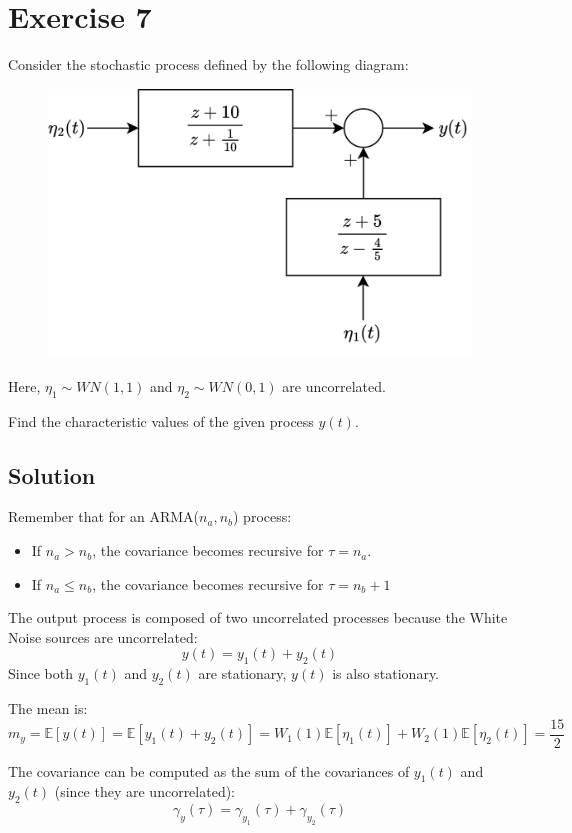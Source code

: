 \section{Exercise 7}

Consider the stochastic process defined by the following diagram:
\begin{figure}[H]
    \centering
    \includegraphics[width=0.5\linewidth]{images/block.png}
\end{figure}
Here, $\eta_1 \sim WN(1,1)$ and $\eta_2 \sim WN(0,1)$ are uncorrelated. 

Find the characteristic values of the given process $y(t)$.

\subsection*{Solution}
Remember that for an ARMA($n_a,n_b$) process:
\begin{itemize}
    \item If $n_a>n_b$, the covariance becomes recursive for $\tau=n_a$.
    \item If $n_a \leq n_b$, the covariance becomes recursive for $\tau=n_b+1$
\end{itemize}

The output process is composed of two uncorrelated processes because the  White Noise sources are uncorrelated:
\[y(t)=y_1(t)+y_2(t)\]
Since both $y_1(t)$ and $y_2(t)$ are stationary, $y(t)$ is also stationary.

The mean is: 
\[m_y=\mathbb{E}\left[y(t)\right]=\mathbb{E}\left[y_1(t)+y_2(t)\right]=W_1(1)\mathbb{E}\left[\eta_1(t)\right]+W_2(1)\mathbb{E}\left[\eta_2(t)\right]=\dfrac{15}{2}\]

The covariance can be computed as the sum of the covariances of $y_1(t)$ and $y_2(t)$ (since they are uncorrelated):
\[\gamma_y(\tau)=\gamma_{y_1}(\tau)+\gamma_{y_2}(\tau)\]

